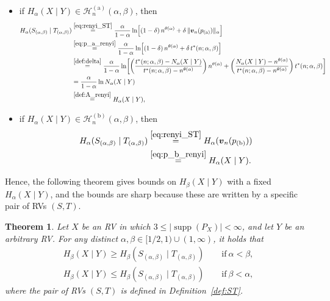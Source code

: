 \documentclass[conference, draftcls, onecolumn]{IEEEtran}
\theoremstyle{plain}
\newtheorem{theorem}{Theorem}
\newcommand{\bvec}[1]{\boldsymbol{#1}}
\newcommand{\supp}{\operatorname{supp}}
\newcommand{\defref}[1]{Definition~\ref{#1}}
\begin{document}
\begin{itemize}
\item
if $H_{\alpha}(X \mid Y) \in \mathcal{H}_{n}^{(\mathrm{a})}( \alpha, \beta )$, then
\begin{align}
H_{\alpha}(S_{(\alpha, \beta)} \mid T_{(\alpha, \beta)})
& \overset{\eqref{eq:renyi_ST}}{=}
\frac{ \alpha }{ 1 - \alpha } \ln \! \Big[ (1-\delta) \, n^{\theta( \alpha )} + \delta \, \| \bvec{v}_{n}( p_{(\mathrm{a})} ) \|_{\alpha} \Big]
\\
& \overset{\eqref{eq:p_a_renyi}}{=}
\frac{ \alpha }{ 1 - \alpha } \ln \! \Big[ (1-\delta) \, n^{\theta( \alpha )} + \delta \, t^{\ast}(n; \alpha, \beta ) \Big]
\\
& \overset{\eqref{def:delta}}{=}
\frac{ \alpha }{ 1 - \alpha } \ln \! \bigg[ \bigg( \frac{ t^{\ast}(n; \alpha, \beta) - N_{\alpha}(X \mid Y) }{ t^{\ast}(n; \alpha, \beta) - n^{\theta( \alpha )} } \bigg) \, n^{\theta( \alpha )} + \bigg( \frac{ N_{\alpha}(X \mid Y) - n^{\theta( \alpha )} }{ t^{\ast}(n; \alpha, \beta) - n^{\theta( \alpha )} } \bigg) \, t^{\ast}(n; \alpha, \beta ) \bigg]
\\
& =
\frac{ \alpha }{ 1 - \alpha } \ln N_{\alpha}(X \mid Y)
\\
& \overset{\eqref{def:A_renyi}}{=}
H_{\alpha}(X \mid Y) ,
\label{eq:ST_alpha_1}
\end{align}
\item
if $H_{\alpha}(X \mid Y) \in \mathcal{H}_{n}^{(\mathrm{b})}( \alpha, \beta )$, then
\begin{align}
H_{\alpha}(S_{(\alpha, \beta)} \mid T_{(\alpha, \beta)})
& \overset{\eqref{eq:renyi_ST}}{=}
H_{\alpha}( \bvec{v}_{n}( p_{(\mathrm{b})} ) )
\\
& \overset{\eqref{eq:p_b_renyi}}{=}
H_{\alpha}(X \mid Y) .
\label{eq:ST_alpha_2}
\end{align}
\end{itemize}
Hence, the following theorem gives bounds on $H_{\beta}(X \mid Y)$ with a fixed $H_{\alpha}(X \mid Y)$, and the bounds are sharp because these are written by a specific pair of RVs $(S, T)$.



\begin{theorem}
\label{th:ST}
Let $X$ be an RV in which $3 \le |\! \supp( P_{X} )| < \infty$, and let $Y$ be an arbitrary RV.
For any distinct $\alpha, \beta \in [1/2, 1) \cup (1, \infty)$, it holds that
\begin{align}
H_{\beta}(X \mid Y)
\ge
H_{\beta}(S_{(\alpha, \beta)} \mid T_{(\alpha, \beta)})
\qquad
\mathrm{if} \ \alpha < \beta ,
\\
H_{\beta}(X \mid Y)
\le
H_{\beta}(S_{(\alpha, \beta)} \mid T_{(\alpha, \beta)})
\qquad
\mathrm{if} \ \beta < \alpha ,
\end{align}
where the pair of RVs $(S, T)$ is defined in \defref{def:ST}.
\end{theorem}
\end{document}
